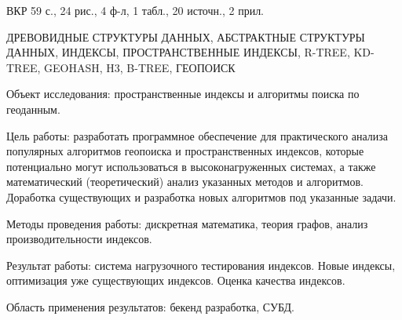 \Referat %

ВКР 59 с., 24 рис., 4 ф-л, 1 табл., 20 источн., 2 прил. %

\noindent ДРЕВОВИДНЫЕ СТРУКТУРЫ ДАННЫХ, АБСТРАКТНЫЕ СТРУКТУРЫ ДАННЫХ, ИНДЕКСЫ, ПРОСТРАНСТВЕННЫЕ ИНДЕКСЫ, R-TREE, KD-TREE, GEOHASH, H3, B-TREE, ГЕОПОИСК


Объект исследования: пространственные индексы и алгоритмы поиска по геоданным. 

Цель работы: разработать программное обеспечение для практического анализа популярных алгоритмов геопоиска и пространственных индексов, которые потенциально могут использоваться в высоконагруженных системах, а также математический (теоретический) анализ указанных методов и алгоритмов. Доработка существующих и разработка новых алгоритмов под указанные задачи.

Методы проведения работы: дискретная математика, теория графов, анализ производительности индексов. 

Результат работы: система нагрузочного тестирования индексов. Новые индексы, оптимизация уже существующих индексов. Оценка качества индексов. 

Область применения результатов: бекенд разработка, СУБД.



